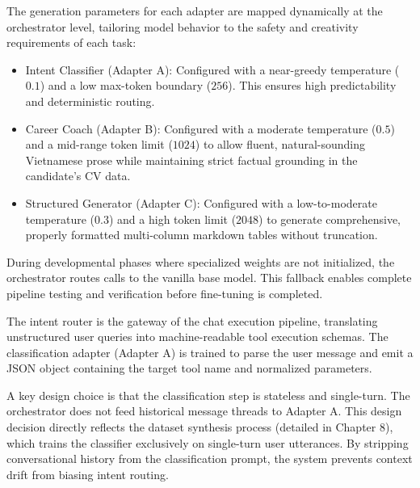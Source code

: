 \documentclass[12pt, a4paper]{report}
\begin{document}
\vspace{0.3cm}

The generation parameters for each adapter are mapped dynamically at the orchestrator level, tailoring model behavior to the safety and creativity requirements of each task:
\begin{itemize}
    \item Intent Classifier (Adapter A): Configured with a near-greedy temperature ($0.1$) and a low max-token boundary ($256$). This ensures high predictability and deterministic routing.
    \item Career Coach (Adapter B): Configured with a moderate temperature ($0.5$) and a mid-range token limit ($1024$) to allow fluent, natural-sounding Vietnamese prose while maintaining strict factual grounding in the candidate's CV data.
    \item Structured Generator (Adapter C): Configured with a low-to-moderate temperature ($0.3$) and a high token limit ($2048$) to generate comprehensive, properly formatted multi-column markdown tables without truncation.
\end{itemize}

During developmental phases where specialized weights are not initialized, the orchestrator routes calls to the vanilla base model. This fallback enables complete pipeline testing and verification before fine-tuning is completed.

\vspace{0.6cm}
\vspace{0.4cm}

\vspace{0.3cm}

The intent router is the gateway of the chat execution pipeline, translating unstructured user queries into machine-readable tool execution schemas. The classification adapter (Adapter A) is trained to parse the user message and emit a JSON object containing the target tool name and normalized parameters.

A key design choice is that the classification step is stateless and single-turn. The orchestrator does not feed historical message threads to Adapter A. This design decision directly reflects the dataset synthesis process (detailed in Chapter 8), which trains the classifier exclusively on single-turn user utterances. By stripping conversational history from the classification prompt, the system prevents context drift from biasing intent routing.
\end{document}
